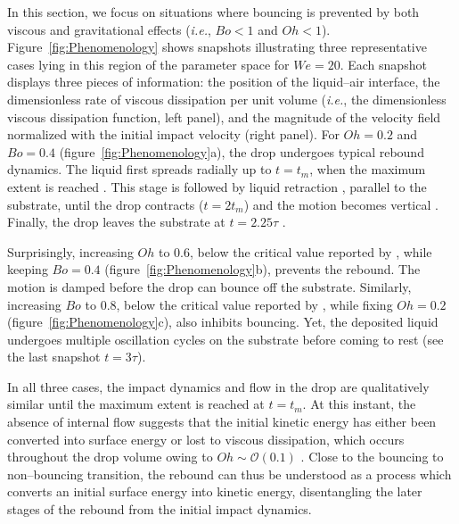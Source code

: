 \documentclass{jfm}
\newcommand{\Ohn}{\mathit{Oh}}
\newcommand{\Wen}{\mathit{We}}
\newcommand{\Bon}{\mathit{Bo}}
\begin{document}
In this section, we focus on situations where bouncing is prevented by both viscous and gravitational effects ({\it i.e.}, $\Bon < 1$ and $\Ohn < 1$).
Figure~\ref{fig:Phenomenology} shows snapshots illustrating three representative cases lying in this region of the parameter space for $\Wen = 20$. Each snapshot displays three pieces of information: the position of the liquid--air interface, the dimensionless rate of viscous dissipation per unit volume ({\it i.e.}, the dimensionless viscous dissipation function, left panel), and the magnitude of the velocity field normalized with the initial impact velocity (right panel). For $\Ohn = 0.2$ and $\Bon = 0.4$ (figure~\ref{fig:Phenomenology}a), the drop undergoes typical rebound dynamics. The liquid first spreads radially up to $t = t_m$, when the maximum extent is reached \citep{Clanet2004, eggers2010drop, laan2014maximum, wildeman-2016-jfm}. This stage is followed by liquid retraction \citep{bartolo2005retraction}, parallel to the substrate, until the drop contracts ($t = 2t_m$) and the motion becomes vertical \citep{chantelot2018rebonds, zhang2022impact}. Finally, the drop leaves the substrate at $t = 2.25\tau$ \citep{richard2000bouncing, richard2002contact}. 

Surprisingly, increasing $\Ohn$ to $0.6$, below the critical value reported by \citet{jha2020viscous}, while keeping $\Bon = 0.4$ (figure~\ref{fig:Phenomenology}b), prevents the rebound. The motion is damped before the drop can bounce off the substrate.
Similarly, increasing $\Bon$ to 0.8, below the critical value reported by \citet{biance2006}, while fixing $\Ohn = 0.2$ (figure~\ref{fig:Phenomenology}c), also inhibits bouncing.  Yet, the deposited liquid undergoes multiple oscillation cycles on the substrate before coming to rest (see the last snapshot $t = 3\tau$).

In all three cases, the impact dynamics and flow in the drop are qualitatively similar until the maximum extent is reached at $t=t_m$. 
At this instant, the absence of internal flow suggests that the initial kinetic energy has either been converted into surface energy or lost to viscous dissipation, which occurs throughout the drop volume owing to $\Ohn \sim \mathcal{O}\left(0.1\right)$ \citep{eggers2010drop}.
Close to the bouncing to non--bouncing transition, the rebound can thus be understood as a process which converts an initial surface energy into kinetic energy, disentangling the later stages of the rebound from the initial impact dynamics.
\end{document}
